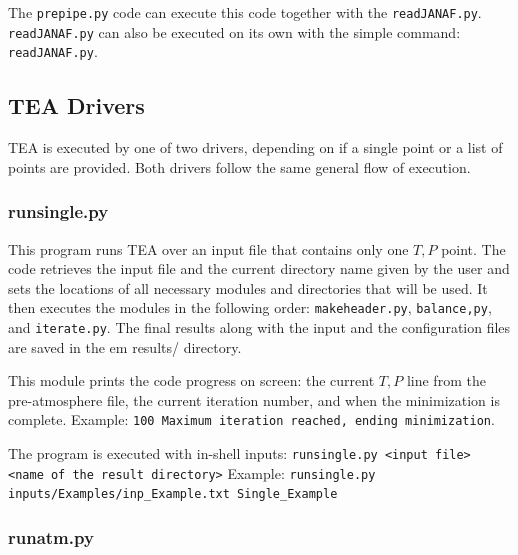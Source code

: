 The \texttt{prepipe.py} code can execute this code together with
the \texttt{readJANAF.py}. \newline
\texttt{readJANAF.py} can also be executed on its own with the simple command: 
\texttt{readJANAF.py}. 



\subsection{TEA Drivers}

TEA is executed by one of two drivers, depending on if a
single  point or a list of  points are
provided. Both drivers follow the same general flow of execution.

\subsubsection{runsingle.py}
\label{runsingleSec}

This program runs TEA over an input file that contains only one ${T,
P}$ point. The code retrieves the input file and the current directory
name given by the user and sets the locations of all necessary modules
and directories that will be used. It then executes the modules in the
following order: \texttt{makeheader.py}, \texttt{balance,py},
and \texttt{iterate.py}. The final results along with the input and
the configuration files are saved in the {em results/} directory.

This module prints the code progress on screen: the current ${T, P}$
line from the pre-atmosphere file, the current iteration number, and
when the minimization is complete.  \newline Example: \texttt{100
Maximum iteration reached, ending minimization}.

The program is executed with in-shell inputs:\newline
\texttt{runsingle.py <input file> <name of the result directory>}\newline
Example: \texttt{runsingle.py inputs/Examples/inp\_Example.txt
Single\_Example}


\subsubsection{runatm.py}
\label{runatmSec}


